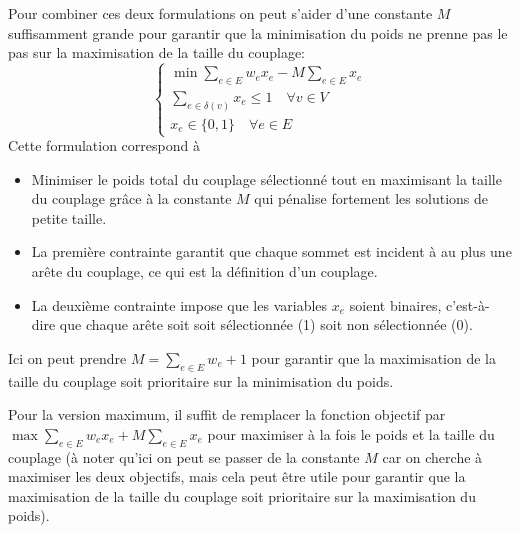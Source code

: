 {\begin{td-sol}[]
\begin{enumerate}
			Pour combiner ces deux formulations on peut s'aider d'une constante \(M\) suffisamment grande pour garantir que la minimisation du poids ne prenne pas le pas sur la maximisation de la taille du couplage:
			\begin{equation*}
				\begin{cases}
					\min \sum_{e \in E} w_e x_e - M \sum_{e \in E} x_e \\
					\sum_{e \in \delta(v)} x_e \leq 1 \quad \forall v \in V \\
					x_e \in \{0, 1\} \quad \forall e \in E
				\end{cases}
			\end{equation*}
			Cette formulation correspond à
			\begin{itemize}
				\item Minimiser le poids total du couplage sélectionné tout en maximisant la taille du couplage grâce à la constante \(M\) qui pénalise fortement les solutions de petite taille.
				\item La première contrainte garantit que chaque sommet est incident à au plus une arête du couplage, ce qui est la définition d'un couplage.
				\item La deuxième contrainte impose que les variables \(x_e\) soient binaires, c'est-à-dire que chaque arête soit soit sélectionnée (1) soit non sélectionnée (0).
			\end{itemize}
			Ici on peut prendre \(M = \sum_{e \in E} w_e + 1\) pour garantir que la maximisation de la taille du couplage soit prioritaire sur la minimisation du poids.

			Pour la version maximum, il suffit de remplacer la fonction objectif par \(\max \sum_{e \in E} w_e x_e + M \sum_{e \in E} x_e\) pour maximiser à la fois le poids et la taille du couplage (à noter qu'ici on peut se passer de la constante \(M\) car on cherche à maximiser les deux objectifs, mais cela peut être utile pour garantir que la maximisation de la taille du couplage soit prioritaire sur la maximisation du poids).


\end{enumerate}
\end{td-sol}}
